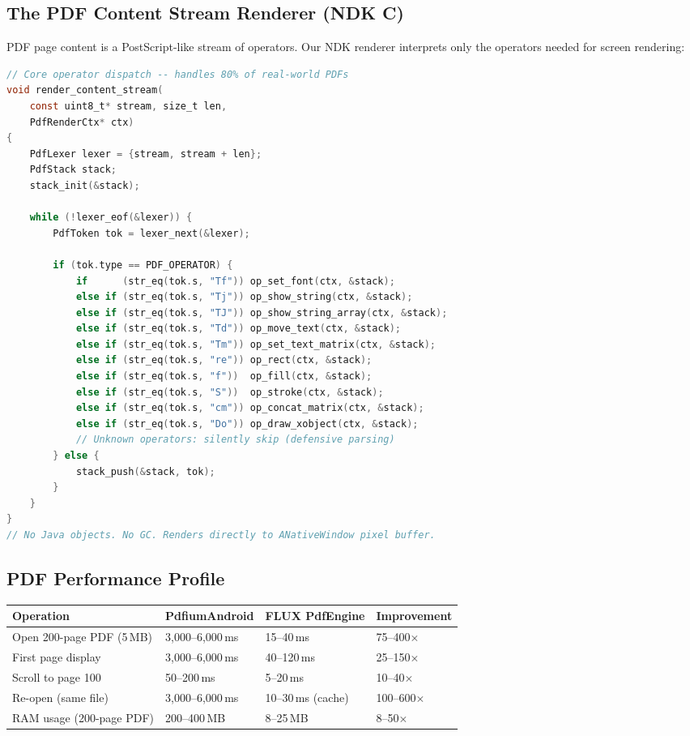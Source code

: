 \documentclass[11pt, a4paper, openright]{report}
\begin{document}
\subsection{The PDF Content Stream Renderer (NDK C)}

PDF page content is a PostScript-like stream of operators. Our NDK renderer interprets only the operators needed for screen rendering:

\begin{lstlisting}[language=C, caption=pdf\_render.c --- NDK Content Stream Interpreter]
// Core operator dispatch -- handles 80% of real-world PDFs
void render_content_stream(
    const uint8_t* stream, size_t len,
    PdfRenderCtx* ctx)
{
    PdfLexer lexer = {stream, stream + len};
    PdfStack stack;
    stack_init(&stack);

    while (!lexer_eof(&lexer)) {
        PdfToken tok = lexer_next(&lexer);

        if (tok.type == PDF_OPERATOR) {
            if      (str_eq(tok.s, "Tf")) op_set_font(ctx, &stack);
            else if (str_eq(tok.s, "Tj")) op_show_string(ctx, &stack);
            else if (str_eq(tok.s, "TJ")) op_show_string_array(ctx, &stack);
            else if (str_eq(tok.s, "Td")) op_move_text(ctx, &stack);
            else if (str_eq(tok.s, "Tm")) op_set_text_matrix(ctx, &stack);
            else if (str_eq(tok.s, "re")) op_rect(ctx, &stack);
            else if (str_eq(tok.s, "f"))  op_fill(ctx, &stack);
            else if (str_eq(tok.s, "S"))  op_stroke(ctx, &stack);
            else if (str_eq(tok.s, "cm")) op_concat_matrix(ctx, &stack);
            else if (str_eq(tok.s, "Do")) op_draw_xobject(ctx, &stack);
            // Unknown operators: silently skip (defensive parsing)
        } else {
            stack_push(&stack, tok);
        }
    }
}
// No Java objects. No GC. Renders directly to ANativeWindow pixel buffer.
\end{lstlisting}

\subsection{PDF Performance Profile}

\begin{longtable}{@{}p{44mm}p{32mm}p{32mm}p{32mm}@{}}
\toprule
\textbf{Operation} & \textbf{PdfiumAndroid} & \textbf{FLUX PdfEngine} & \textbf{Improvement} \\
\midrule
Open 200-page PDF (5\,MB) & 3,000--6,000\,ms & 15--40\,ms & 75--400$\times$ \\
First page display & 3,000--6,000\,ms & 40--120\,ms & 25--150$\times$ \\
Scroll to page 100 & 50--200\,ms & 5--20\,ms & 10--40$\times$ \\
Re-open (same file) & 3,000--6,000\,ms & 10--30\,ms (cache) & 100--600$\times$ \\
RAM usage (200-page PDF) & 200--400\,MB & 8--25\,MB & 8--50$\times$ \\
\bottomrule
\end{longtable}
\end{document}
